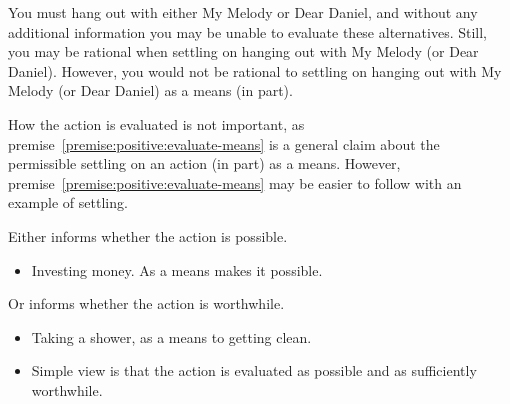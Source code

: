 \documentclass[10pt]{article}
\newcommand{\hozlinedash}[0]{%
  \noindent\hdashrule[0.5ex][c]{\textwidth}{.1pt}{2.5pt}
}
\begin{document}
\begin{example}
  You must hang out with either My Melody or Dear Daniel, and without any additional information you may be unable to evaluate these alternatives.
  Still, you may be rational when settling on hanging out with My Melody (or Dear Daniel).
  However, you would not be rational to settling on hanging out with My Melody (or Dear Daniel) as a means (in part).
\end{example}



\hozlinedash

How the action is evaluated is not important, as premise~\ref{premise:positive:evaluate-means} is a general claim about the permissible settling on an action (in part) as a means.
However, premise~\ref{premise:positive:evaluate-means} may be easier to follow with an example of settling.

Either informs whether the action is possible.
\begin{itemize}
\item Investing money.
  As a means makes it possible.
\end{itemize}
Or informs whether the action is worthwhile.
\begin{itemize}
\item Taking a shower, as a means to getting clean.
\end{itemize}


\begin{itemize}
\item Simple view is that the action is evaluated as possible and as sufficiently worthwhile.
\end{itemize}
\end{document}

